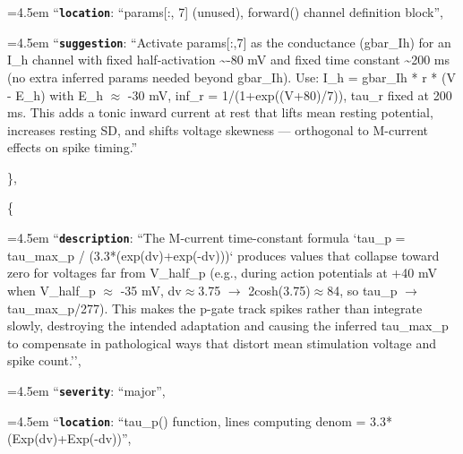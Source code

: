 \begin{tcolorbox}
\par\noindent\hangindent=4.5em \hspace*{3.0em}\hspace*{1.5em}``\textbf{\texttt{location}}\textquotesingle\textquotesingle: ``params[:, 7] (unused), forward() channel definition block'',
\par\noindent\hangindent=4.5em \hspace*{3.0em}\hspace*{1.5em}``\textbf{\texttt{suggestion}}\textquotesingle\textquotesingle: ``Activate params[:,7] as the conductance (gbar\_Ih) for an I\_h channel with fixed half-activation \textasciitilde{}-80 mV and fixed time constant \textasciitilde{}200 ms (no extra inferred params needed beyond gbar\_Ih). Use: I\_h = gbar\_Ih * r * (V - E\_h) with E\_h $\approx$ -30 mV, inf\_r = 1/(1+exp((V+80)/7)), tau\_r fixed at 200 ms. This adds a tonic inward current at rest that lifts mean resting potential, increases resting SD, and shifts voltage skewness --- orthogonal to M-current effects on spike timing.''
\par\noindent \hspace*{3.0em}\},
\par\noindent \hspace*{3.0em}\{
\par\noindent\hangindent=4.5em \hspace*{3.0em}\hspace*{1.5em}``\textbf{\texttt{description}}\textquotesingle\textquotesingle: ``The M-current time-constant formula `tau\_p = tau\_max\_p / (3.3*(exp(dv)+exp(-dv)))` produces values that collapse toward zero for voltages far from V\_half\_p (e.g., during action potentials at +40 mV when V\_half\_p $\approx$ -35 mV, dv$\approx$3.75 $\rightarrow$ 2cosh(3.75)$\approx$84, so tau\_p $\rightarrow$ tau\_max\_p/277). This makes the p-gate track spikes rather than integrate slowly, destroying the intended adaptation and causing the inferred tau\_max\_p to compensate in pathological ways that distort mean stimulation voltage and spike count.'',
\par\noindent\hangindent=4.5em \hspace*{3.0em}\hspace*{1.5em}``\textbf{\texttt{severity}}\textquotesingle\textquotesingle: ``major'',
\par\noindent\hangindent=4.5em \hspace*{3.0em}\hspace*{1.5em}``\textbf{\texttt{location}}\textquotesingle\textquotesingle: ``tau\_p() function, lines computing denom = 3.3*(Exp(dv)+Exp(-dv))'',

\end{tcolorbox}

